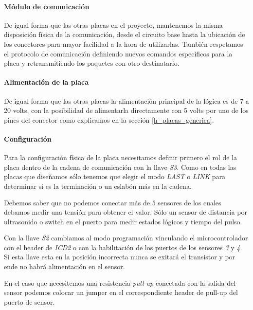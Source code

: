 \paragraph{M\'odulo de comunicaci\'on}
\label{h_placas_sensado_comm}

De igual forma que las otras placas en el proyecto, mantenemos la misma disposici\'on f\'isica de
la comunicaci\'on, desde el circuito base hasta la ubicaci\'on de los conectores para mayor facilidad
a la hora de utilizarlas.
Tambi\'en respetamos el protocolo de comunicaci\'on definiendo nuevos comandos espec\'ificos para la
placa y retransmitiendo los paquetes con otro destinatario.

\paragraph{Alimentaci\'on de la placa}
\label{h_placas_sensado_alimentacion}

De igual forma que las otras placas la alimentaci\'on principal de la l\'ogica es de 7 a 20 volts,
con la posibilidad de alimentarla directamente con 5 volts por uno de los pines del conector como
explicamos en la secci\'on \ref{h_placas_generica}.

\paragraph{Configuraci\'on}
\label{h_placas_sensado_config}

Para la configuraci\'on f\'isica de la placa necesitamos definir primero el rol de la placa dentro de
la cadena de comunicaci\'on con la llave \emph{S3}.
Como en todas las placas que dise\~namos s\'olo tenemos que elegir el modo \emph{LAST} o \emph{LINK}
para determinar si es la terminaci\'on o un eslab\'on m\'as en la cadena.

Debemos saber que no podemos conectar m\'as de $5$ sensores de los cuales debamos medir una tensi\'on
para obtener el valor.
S\'olo un sensor de distancia por ultrasonido o switch en el puerto para
medir estados l\'ogicos y tiempo del pulso.

Con la llave \emph{S2} cambiamos al modo programaci\'on vinculando el microcontrolador con el header
de \emph{ICD2} o con la habilitaci\'on de los puertos de los sensores \emph{3} y \emph{4}.
Si esta llave esta en la posici\'on incorrecta nunca se exitar\'a el transistor y por ende no habr\'a
alimentaci\'on en el sensor.

En el caso que necesitemos una resistencia \emph{pull-up} conectada con la salida del sensor podemos
colocar un jumper en el correspondiente header de pull-up del puerto de sensor.


